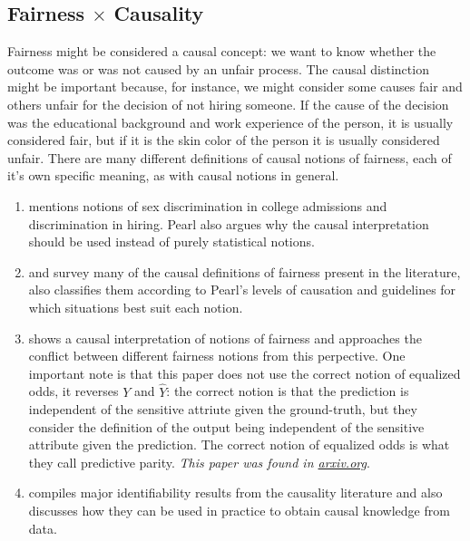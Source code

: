 \subsection{Fairness $\times$ Causality}

Fairness might be considered a causal concept: we want to know whether the outcome was or was not caused by an unfair process. The causal distinction might be important because, for instance, we might consider some causes fair and others unfair for the decision of not hiring someone. If the cause of the decision was the educational background and work experience of the person, it is usually considered fair, but if it is the skin color of the person it is usually considered unfair. There are many different definitions of causal notions of fairness, each of it's own specific meaning, as with causal notions in general.

\begin{enumerate}
\item \cite{Causality} mentions notions of sex discrimination in college admissions and discrimination in hiring. Pearl also argues why the causal interpretation should be used instead of purely statistical notions.
\item \cite{when causality meets fairness: a survey} and \cite{A review of causality-based fairness machine learning} survey many of the causal definitions of fairness present in the literature, \cite{when causality meets fairness: a survey} also classifies them according to Pearl's levels of causation and guidelines for which situations best suit each notion.
\item \cite{The Impossibility Theorem of Machine Fairness: a Causal Perspective} shows a causal interpretation of notions of fairness and approaches the conflict between different fairness notions from this perpective. One important note is that this paper does not use the correct notion of equalized odds, it reverses $Y$ and $\hat{Y}$: the correct notion is that the prediction is independent of the sensitive attriute given the ground-truth, but they consider the definition of the output being independent of the sensitive attribute given the prediction. The correct notion of equalized odds is what they call predictive parity. \emph{This paper was found in \url{arxiv.org}}.
\item \cite{Identifiability of Causal-based ML Fairness Notions} compiles major identifiability results from the causality literature and also discusses how they can be used in practice to obtain causal knowledge from data.
\end{enumerate}


